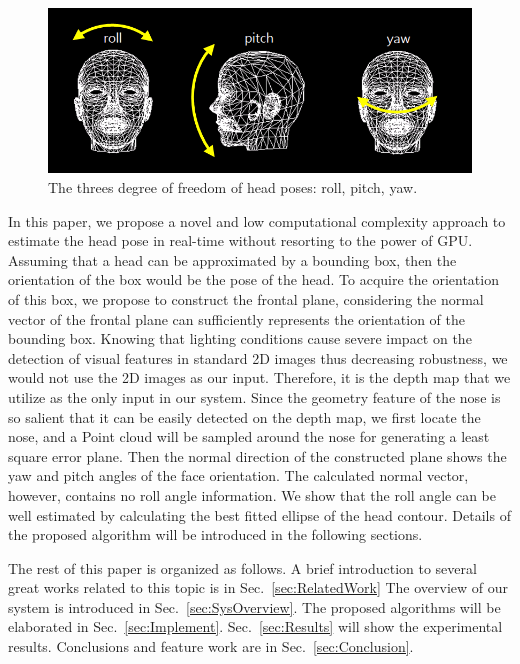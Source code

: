 \begin{figure}
\includegraphics[width=1.0\linewidth]{./fig1.png}
\caption{The threes degree of freedom of head poses: roll, pitch, yaw.}
\label{fig:PoseParameters}       %
\end{figure}

In this paper, we propose a novel and low computational complexity approach to estimate the head pose in real-time without resorting to the power of GPU. Assuming that a head can be approximated by a bounding box, then the orientation of the box would be the pose of the head. To acquire the orientation of this box, we propose to construct the frontal plane, considering the normal vector of the frontal plane can sufficiently represents the orientation of the bounding box. Knowing that lighting conditions cause severe impact on the detection of visual features in standard 2D images thus decreasing robustness, we would not use the 2D images as our input. Therefore, it is the depth map that we utilize as the only input in our system. Since the geometry feature of the nose is so salient that it can be easily detected on the depth map, we first locate the nose, and a Point cloud will be sampled around the nose for generating a least square error plane. Then the normal direction of the constructed plane shows the yaw and pitch angles of the face orientation. The calculated normal vector, however, contains no roll angle information. We show that the roll angle can be well estimated by calculating the best fitted ellipse of the head contour. Details of the proposed algorithm will be introduced in the following sections.

The rest of this paper is organized as follows. A brief introduction to several great works related to this topic is in Sec.~\ref{sec:RelatedWork} The overview of our system is introduced in Sec.~\ref{sec:SysOverview}. The proposed algorithms will be elaborated in Sec.~\ref{sec:Implement}. Sec.~\ref{sec:Results} will show the experimental results. Conclusions and feature work are in Sec.~\ref{sec:Conclusion}.

